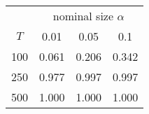 % 
\begin{tabular}{cccc}
  \hline
  & \multicolumn{3}{c}{nominal size $\alpha$} \\
 $T$ & 0.01 & 0.05 & 0.1 \\
 \hline
100 & 0.061 & 0.206 & 0.342 \\ 
  250 & 0.977 & 0.997 & 0.997 \\ 
  500 & 1.000 & 1.000 & 1.000 \\ 
   \hline
\end{tabular}
